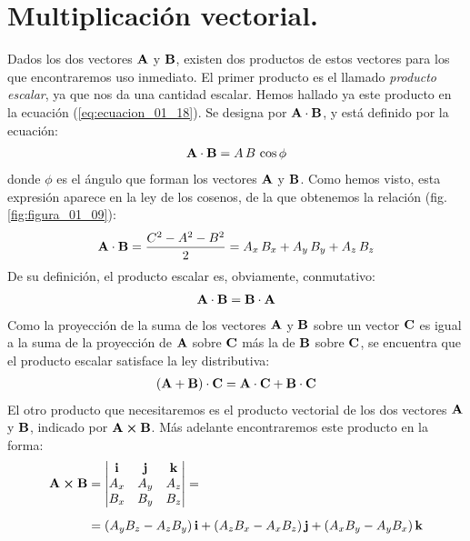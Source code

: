 \section{Multiplicación vectorial.}

Dados los dos vectores $\vb{A}$ y $\vb{B}$, existen dos productos de estos vectores para los que encontraremos uso inmediato. El primer producto es el llamado \emph{producto escalar}, ya que nos da una cantidad escalar. Hemos hallado ya este producto en la ecuación (\ref{eq:ecuacion_01_18}). Se designa por $\vb{A} \cdot \vb{B}$, y está definido por la ecuación:
\begin{align}
    \vb{A} \cdot \vb{B} = A \, B \, \cos \phi
    \label{eq:ecuacion_01_20}
\end{align}
donde $\phi$ es el ángulo que forman los vectores $\vb{A}$ y $\vb{B}$. Como hemos visto, esta expresión aparece en la ley de los cosenos, de la que obtenemos la relación (fig. \ref{fig:figura_01_09}):
\begin{align}
    \vb{A} \cdot \vb{B} = \dfrac{C^{2} - A^{2} - B^{2}}{2} = A_{x} \, B_{x} + A_{y} \, B_{y} + A_{z} \, B_{z}
    \label{eq:ecuacion_01_21}
\end{align}
De su definición, el producto escalar es, obviamente, conmutativo:
\begin{align*}
    \vb{A} \cdot \vb{B} = \vb{B} \cdot \vb{A}
\end{align*}
Como la proyección de la suma de los vectores $\vb{A}$ y $\vb{B}$ sobre un vector $\vb{C}$ es igual a la suma de la proyección de $\vb{A}$ sobre $\vb{C}$ más la de $\vb{B}$ sobre $\vb{C}$, se encuentra que el producto escalar satisface la ley distributiva:
\begin{align*}
\left( \vb{A} + \vb{B} \right) \cdot \vb{C} = \vb{A} \cdot \vb{C} + \vb{B} \cdot \vb{C}
\end{align*}
El otro producto que necesitaremos es el producto vectorial de los dos vectores $\vb{A}$ y $\vb{B}$, indicado por $\vb{A} \cp \vb{B}$. Más adelante encontraremos este producto en la forma:
\begin{align}
\begin{aligned}[b]
\vb{A} \cp \vb{B} &= \mdet{
    \vb{i} & \vb{j} & \vb{k} \\
    A_{x} & A_{y} & A_{z} \\
    B_{x} & B_{y} & B_{z} } = \\[0.5em]
    &= \left( A_{y} B_{z} - A_{z} B_{y} \right) \vb{i} + \left( A_{z} B_{x} - A_{x} B_{z} \right) \vb{j} + \left( A_{x} B_{y} - A_{y} B_{x} \right) \vb{k}
\end{aligned}
\label{eq:ecuacion_01_22}
\end{align}
